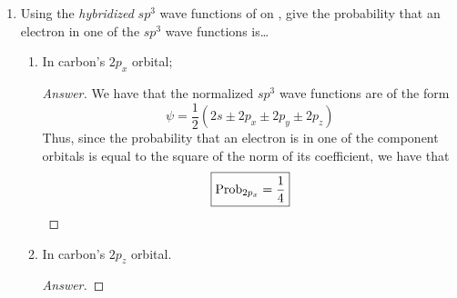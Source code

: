 \documentclass[../psets.tex]{subfiles}
\begin{document}
\begin{enumerate}
\begin{enumerate}
\begin{proof}[Answer]
\begin{center}
            \end{center}
        \end{proof}
        \item With Grassmann notation, express the MO ground-state wave function for .
        \begin{proof}[Answer]
            We have that
            \begin{equation*}
                \psi(1,2,3,4,5,6) = 1s\alpha(1)\wedge 1s\beta(2)\wedge 1\sigma_g\alpha(3)\wedge 1\sigma_g\beta(4)\wedge 2\sigma_g\alpha(5)\wedge 2\sigma_g\beta(6)
            \end{equation*}
        \end{proof}
    \end{enumerate}
    \item Using the \emph{hybridized} $sp^3$ wave functions of  on \textcite[376]{bib:McQuarrieSimon}, give the probability that an electron in one of the $sp^3$ wave functions is\dots
    \begin{enumerate}
        \item In carbon's $2p_x$ orbital;
        \begin{proof}[Answer]
            We have that the normalized $sp^3$ wave functions are of the form
            \begin{equation*}
                \psi = \frac{1}{2}(2s\pm 2p_x\pm 2p_y\pm 2p_z)
            \end{equation*}
            Thus, since the probability that an electron is in one of the component orbitals is equal to the square of the norm of its coefficient, we have that
            \begin{equation*}
                \boxed{\operatorname{Prob}_{2p_x} = \frac{1}{4}}
            \end{equation*}
        \end{proof}
        \item In carbon's $2p_z$ orbital.
        \begin{proof}[Answer]

\end{proof}
\end{enumerate}
\end{enumerate}
\end{document}
